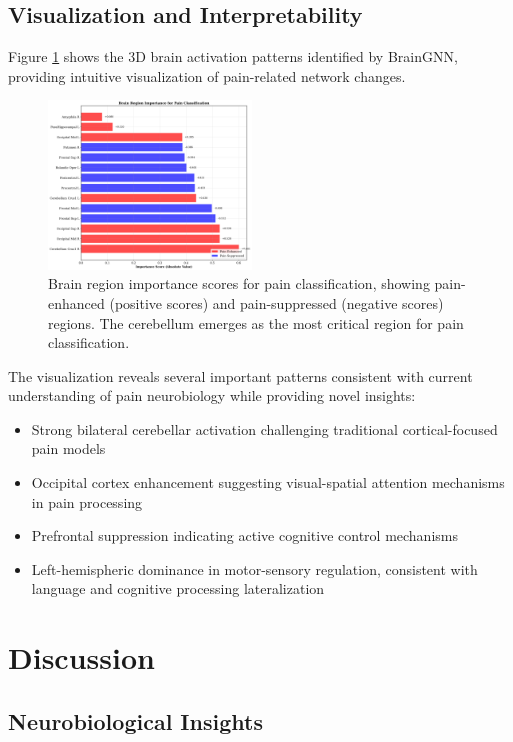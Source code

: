 \documentclass[10pt,journal,compsoc]{IEEEtran}
\begin{document}
\subsection{Visualization and Interpretability}

Figure \ref{fig:brain_activation} shows the 3D brain activation patterns identified by BrainGNN, providing intuitive visualization of pain-related network changes.

\begin{figure}[htbp]
\centering
\includegraphics[width=0.48\textwidth]{figures/brain_regions_importance.png}
\caption{Brain region importance scores for pain classification, showing pain-enhanced (positive scores) and pain-suppressed (negative scores) regions. The cerebellum emerges as the most critical region for pain classification.}
\label{fig:brain_activation}
\end{figure}

The visualization reveals several important patterns consistent with current understanding of pain neurobiology while providing novel insights:
\begin{itemize}
\item Strong bilateral cerebellar activation challenging traditional cortical-focused pain models
\item Occipital cortex enhancement suggesting visual-spatial attention mechanisms in pain processing
\item Prefrontal suppression indicating active cognitive control mechanisms
\item Left-hemispheric dominance in motor-sensory regulation, consistent with language and cognitive processing lateralization
\end{itemize}

\section{Discussion}

\subsection{Neurobiological Insights}
\end{document}
